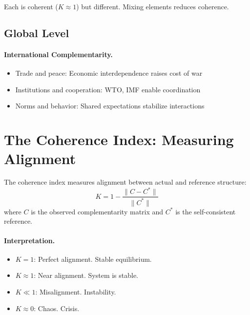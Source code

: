 Each is coherent ($K \approx 1$) but different. Mixing elements reduces coherence.

\subsection{Global Level}
\label{sec:comp-global}

\paragraph{International Complementarity.}
\begin{itemize}[nosep]
  \item Trade and peace: Economic interdependence raises cost of war
  \item Institutions and cooperation: WTO, IMF enable coordination
  \item Norms and behavior: Shared expectations stabilize interactions
\end{itemize}



\section{The Coherence Index: Measuring Alignment}
\label{sec:comp-coherence}


\begin{definition}
The coherence index measures alignment between actual and reference structure:
\begin{equation}
  K = 1 - \frac{\|C - C^*\|}{\|C^*\|}
\end{equation}
where $C$ is the observed complementarity matrix and $C^*$ is the self-consistent reference.
\end{definition}

\paragraph{Interpretation.}
\begin{itemize}[nosep]
  \item $K = 1$: Perfect alignment. Stable equilibrium.
  \item $K \approx 1$: Near alignment. System is stable.
  \item $K \ll 1$: Misalignment. Instability.
  \item $K \approx 0$: Chaos. Crisis.
\end{itemize}

